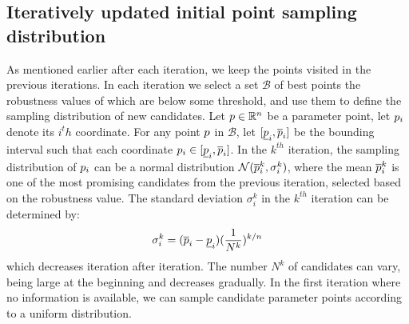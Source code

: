 \subsection{Iteratively updated initial point sampling distribution}
As mentioned earlier after each iteration, we keep the points visited in the previous iterations. In each iteration we select a set $\mathcal{B}$ of best points the robustness values of which are below some threshold, and use them to define the sampling distribution of new candidates. 
Let $p \in \mathbb{R}^n$ be a parameter point, let $p_i$ denote its $i^th$ coordinate. For any point $p$ in $\mathcal{B}$, let $[\underline{p}_i, \overline{p}_i]$  be the bounding interval such that each coordinate $p_i \in [\underline{p}_i, \overline{p}_i]$. In the $k^{th}$ iteration, the sampling distribution of $p_i$ can be a normal distribution $\mathcal{N}(\overline{p}^k_i, \sigma_i^k)$, where the mean $\overline{p}^k_i$ is one of the most promising candidates from the previous iteration, selected based on the robustness value. The standard deviation $\sigma_i^k$ in the $k^{th}$ iteration can be determined by: 
\begin{equation} \label{eq:sigma}
\sigma_i^k = (\overline{p}_i - \underline{p}_i) (\frac{1}{N^k})^{k/n}
\end{equation}
which decreases iteration after iteration. The number $N^k$ of candidates can vary, being large at the beginning and decreases gradually. In the first iteration where no information is available, we can sample candidate parameter points according to a uniform distribution. 


